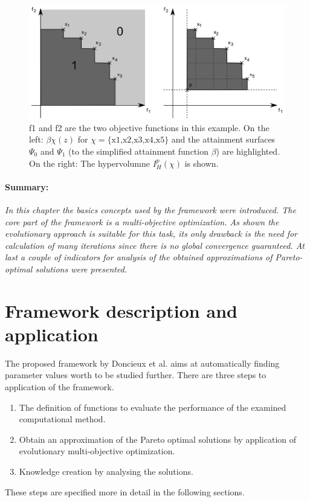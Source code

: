 \documentclass[12pt,twoside]{article}
\theoremstyle{plain}
\theoremstyle{definition}
\theoremstyle{remark}
\begin{document}
 \addtocounter{footnote}{-1}
\begin{figure}[h]
	\begin{center}
		\includegraphics[width=1\textwidth]{Bilder/attainment.png}
	\end{center}
	\caption[f1 and f2 are the two objective functions in this example. On the left: $\beta\chi(z)$ for $\chi = \text{\{x1,x2,x3,x4,x5\}}$ and the attainment surfaces $\Psi_0$ and $\Psi_1$ (to the simplified attainment function $\beta$) are highlighted. On the right: The hypervolumne $I^p_H(\chi)$ is shown.]{f1 and f2 are the two objective functions in this example. On the left: $\beta\chi(z)$ for $\chi = \text{\{x1,x2,x3,x4,x5\}}$ and the attainment surfaces $\Psi_0$ and $\Psi_1$ (to the simplified attainment function $\beta$) are highlighted. On the right: The hypervolumne $I^p_H(\chi)$ is shown. \footnotemark}
	\label{fig:attainment}
\end{figure}
\paragraph{Summary:}
\textit{
	In this chapter the basics concepts used by the framework were introduced.
	The core part of the framework is a multi-objective optimization. 
	As shown the evolutionary approach is suitable for this task, its only drawback is the need for calculation of many iterations since there is no global convergence guaranteed.
	At last a couple of indicators for analysis of the obtained approximations of Pareto-optimal solutions were presented.
}

\section{Framework description and application}
\label{sec:model}
The proposed framework by Doncieux et al. \cite{doncieux2015multi} aims at automatically finding parameter values worth to be studied further.
There are three steps to application of the framework.
\begin{enumerate}
	\item The definition of functions to evaluate the performance of the examined computational method.
	\item Obtain an approximation of the Pareto optimal solutions by application of evolutionary multi-objective optimization.
	\item Knowledge creation by analysing the solutions.
\end{enumerate}
These steps are specified more in detail in the following sections.
\end{document}
